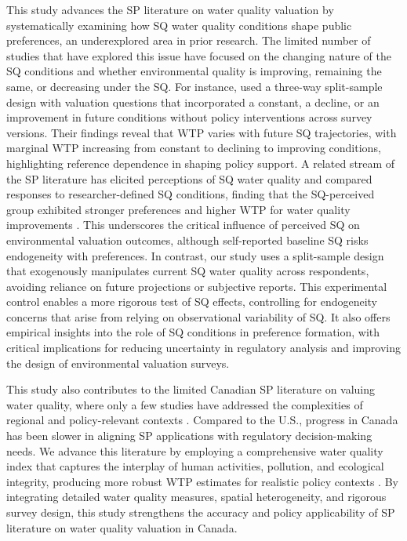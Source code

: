 \documentclass[12pt]{article}
\begin{document}
This study advances the SP literature on water quality valuation by systematically examining how SQ water quality conditions 
shape public preferences, an underexplored area in prior research. The limited number of studies that have explored this issue 
have focused on the changing nature of the SQ conditions and whether environmental quality is improving, remaining the same, or 
decreasing under the SQ. For instance, \textcite{maguire2018muddying} used a three-way split-sample design with valuation questions 
that incorporated a constant, a decline, or an improvement in future conditions without policy interventions across survey versions.
Their findings reveal that WTP varies with future SQ trajectories, with marginal WTP increasing from constant to declining to 
improving conditions, highlighting reference dependence in shaping policy support.  A related stream of the 
SP literature has elicited perceptions of SQ water quality and compared responses to researcher-defined SQ conditions, 
finding that the SQ-perceived group exhibited stronger preferences and higher WTP for water quality improvements \parencite{marsh2011respondents}. 
This underscores the critical influence of perceived SQ on environmental valuation outcomes, although self-reported baseline SQ 
risks endogeneity with preferences. In contrast, our study uses a split-sample design that exogenously manipulates current SQ water 
quality across respondents, avoiding reliance on future projections or subjective reports. This experimental control enables a more 
rigorous test of SQ effects, controlling for endogeneity concerns that arise from relying on observational variability of SQ. 
It also offers empirical insights into the role of SQ conditions in preference formation, with critical implications for reducing 
uncertainty in regulatory analysis and improving the design of environmental valuation surveys.

This study also contributes to the limited Canadian SP literature on valuing water quality, where only a few studies have addressed the 
complexities of regional and policy-relevant contexts \parencite{macaskill2022six}. Compared to the U.S., progress in Canada has been 
slower in aligning SP applications with regulatory decision-making needs. We advance this literature by employing a comprehensive 
water quality index that captures the interplay of human activities, pollution, and ecological integrity, producing more robust WTP 
estimates for realistic policy contexts \parencite{arrow1996there, carson1993value, moore2023measuring}. By integrating detailed water quality 
measures, spatial heterogeneity, and rigorous survey design, this study strengthens the accuracy and policy applicability of SP 
literature on water quality valuation in Canada.
\end{document}
